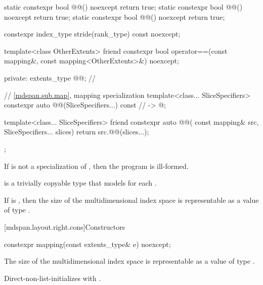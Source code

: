 \begin{codeblock}
{{    static constexpr bool @@() noexcept { return true; }
    static constexpr bool @@() noexcept { return true; }
    static constexpr bool @@() noexcept { return true; }

    constexpr index_type stride(rank_type) const noexcept;

    template<class OtherExtents>
      friend constexpr bool operator==(const mapping&, const mapping<OtherExtents>&) noexcept;

  private:
    extents_type @@{};    // \expos

    // \ref{mdspan.sub.map},  mapping specialization
    template<class... SliceSpecifiers>
      constexpr auto @@(SliceSpecifiers...) const       // \expos
        -> @\seebelow@;

    template<class... SliceSpecifiers>
      friend constexpr auto @@(
        const mapping& src, SliceSpecifiers... slices) {
          return src.@@(slices...);
      }
  };
}
\end{codeblock}

\pnum
If  is not a specialization of ,
then the program is ill-formed.

\pnum
{} is a trivially copyable type
that models  for each .

\pnum
\mandates
If  is ,
then the size of the multidimensional index space 
is representable as a value of type .

[mdspan.layout.right.cons]{Constructors}

%
\begin{itemdecl}
constexpr mapping(const extents_type& e) noexcept;
\end{itemdecl}

\begin{itemdescr}
\pnum
\expects
The size of the multidimensional index space  is representable as
a value of type .

\pnum
\effects
Direct-non-list-initializes  with .
\end{itemdescr}

